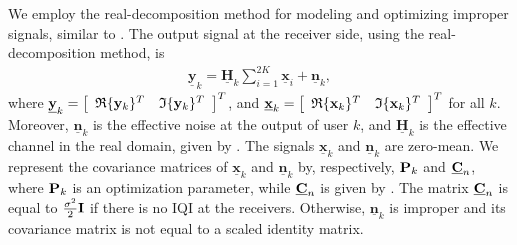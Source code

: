 \documentclass[a4, conference]{IEEEtran}
\theoremstyle{definition}
\begin{document}
We employ the real-decomposition method for modeling and optimizing improper signals, similar to \cite{soleymani2020improper, soleymani2022improper}. The output signal at the receiver side, using the real-decomposition method, is
\begin{align}\label{rec-sig=2}
\underline{\mathbf{y}}_{k}
=
{\underline{\mathbf{H}}_{k}%
\sum_{i=1}^{2K}\underline{\mathbf{x}}_i%
}
+
\underline{\mathbf{n}}_{k},
\end{align}
 where $\underline{\mathbf{y}}_{k}=\left[\begin{array}{cc}\mathfrak{R}\{{\bf y}_{k}\}^T&\mathfrak{I}\{{\bf y}_{k}\}^T\end{array}\right]^T$, and
 $\underline{\mathbf{x}}_k=\left[\begin{array}{cc}\mathfrak{R}\{{\bf x}_k\}^T&\mathfrak{I}\{{\bf x}_k\}^T\end{array}\right]^T$ for all $k$. 
 Moreover,  
$\underline{\mathbf{n}}_{k}$ is the effective noise at the output of user $k$, and $\underline{\mathbf{H}}_{k}$ is the effective channel in the real domain, given by \cite[Lemma 1]{soleymani2022rate}.
The signals $\underline{\mathbf{x}}_k$ and $\underline{\mathbf{n}}_k$ are zero-mean. We represent the covariance matrices of $\underline{\mathbf{x}}_k$ and $\underline{\mathbf{n}}_k$ by, respectively, ${\bf P}_k$ and $\underline{\bf C}_n$, where ${\bf P}_k$ is an optimization parameter, while $\underline{\bf C}_n$ is given by \cite[Lemma 1]{soleymani2022rate}.  
The matrix $\underline{\bf C}_n$ is equal to $\frac{\sigma^2}{2}{\bf I}$ if there is no IQI at the receivers. Otherwise, $\underline{\mathbf{n}}_k$ is improper and its covariance matrix is not equal to a scaled identity matrix. 
\end{document}
